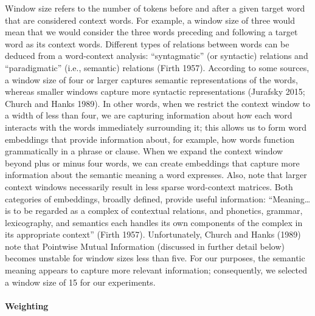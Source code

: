 \documentclass{article}
\begin{document}
Window size refers to the number of tokens before and after a given
target word that are considered context words. For example, a window
size of three would mean that we would consider the three words
preceding and following a target word as its context words. Different
types of relations between words can be deduced from a word-context
analysis: ``syntagmatic'' (or syntactic) relations and ``paradigmatic''
(i.e., semantic) relations (Firth 1957). According to some sources, a
window size of four or larger captures semantic representations of the
words, whereas smaller windows capture more syntactic representations
(Jurafsky 2015; Church and Hanks 1989). In other words, when we restrict
the context window to a width of less than four, we are capturing
information about how each word interacts with the words immediately
surrounding it; this allows us to form word embeddings that provide
information about, for example, how words function grammatically in a
phrase or clause. When we expand the context window beyond plus or minus
four words, we can create embeddings that capture more information about
the semantic meaning a word expresses. Also, note that larger context
windows necessarily result in less sparse word-context matrices. Both
categories of embeddings, broadly defined, provide useful information:
``Meaning\ldots{} is to be regarded as a complex of contextual
relations, and phonetics, grammar, lexicography, and semantics each
handles its own components of the complex in its appropriate context''
(Firth 1957). Unfortunately, Church and Hanks (1989) note that Pointwise
Mutual Information (discussed in further detail below) becomes unstable
for window sizes less than five. For our purposes, the semantic meaning
appears to capture more relevant information; consequently, we selected
a window size of 15 for our experiments.

\hypertarget{weighting}{%
\paragraph{Weighting}\label{weighting}}
\end{document}
